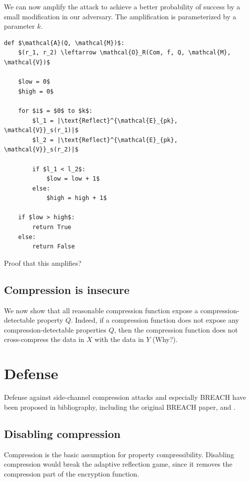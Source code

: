 \documentclass{sig-alternate-05-2015}
\begin{document}
We can now amplify the attack to achieve a better probability of success by a
small modification in our adversary. The amplification is parameterized by a
parameter $k$.

\begin{lstlisting}[texcl,mathescape]
def $\mathcal{A}(Q, \mathcal{M})$:
    $(r_1, r_2) \leftarrow \mathcal{O}_R(Com, f, Q, \mathcal{M}, \mathcal{V})$

    $low = 0$
    $high = 0$

    for $i$ = $0$ to $k$:
        $l_1 = |\text{Reflect}^{\mathcal{E}_{pk}, \mathcal{V}}_s(r_1)|$
        $l_2 = |\text{Reflect}^{\mathcal{E}_{pk}, \mathcal{V}}_s(r_2)|$

        if $l_1 < l_2$:
            $low = low + 1$
        else:
            $high = high + 1$

    if $low > high$:
        return True
    else:
        return False
\end{lstlisting}

Proof that this amplifies?

\subsection{Compression is insecure}\label{subsec:cominsecure}

We now show that all reasonable compression function expose a
compression-detectable property $Q$. Indeed, if a compression function does not
expose any compression-detectable properties $Q$, then the compression function
does not cross-compress the data in $X$ with the data in $Y$ (Why?).

\section{Defense}\label{sec:defense}

Defense against side-channel compression attacks and especially BREACH have been
proposed in bibliography, including the original BREACH paper,
\cite{c6} and \cite{c7}.

\subsection{Disabling compression}\label{subsec:disablecom}
Compression is the basic assumption for property compressibility. Disabling
compression would break the adaptive reflection game, since it removes
the compression part of the encryption function.
\end{document}
